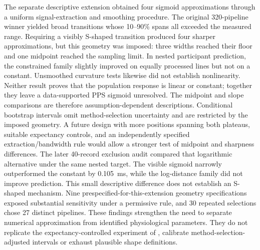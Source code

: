 The separate descriptive extension obtained four sigmoid approximations through a uniform signal-extraction and smoothing procedure. The original 320-pipeline winner yielded broad transitions whose 10--90\% spans all exceeded the measured range. Requiring a visibly S-shaped transition produced four sharper approximations, but this geometry was imposed: three widths reached their floor and one midpoint reached the sampling limit. In nested participant prediction, the constrained family slightly improved on equally processed lines but not on a constant. Unsmoothed curvature tests likewise did not establish nonlinearity. Neither result proves that the population response is linear or constant; together they leave a data-supported PPS sigmoid unresolved. The midpoint and slope comparisons are therefore assumption-dependent descriptions. Conditional bootstrap intervals omit method-selection uncertainty and are restricted by the imposed geometry. A future design with more positions spanning both plateaus, suitable expectancy controls, and an independently specified extraction/bandwidth rule would allow a stronger test of midpoint and sharpness differences. The later 40-record exclusion audit compared that logarithmic alternative under the same nested target. The visible sigmoid narrowly outperformed the constant by 0.105~ms, while the log-distance family did not improve prediction. This small descriptive difference does not establish an S-shaped mechanism. Nine prespecified-for-this-extension geometry specifications exposed substantial sensitivity under a permissive rule, and 30 repeated selections chose 27 distinct pipelines. These findings strengthen the need to separate numerical approximation from identified physiological parameters. They do not replicate the expectancy-controlled experiment of \citet{hobeika2019capturing}, calibrate method-selection-adjusted intervals or exhaust plausible shape definitions.

